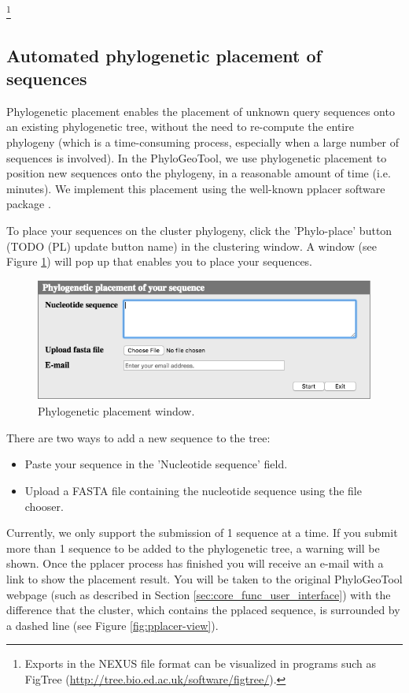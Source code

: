 \documentclass[a4paper, 11pt]{article} %
\begin{document}
\footnote{Exports in the NEXUS file format can be visualized in programs such as FigTree (\url{http://tree.bio.ed.ac.uk/software/figtree/}).}  

\subsection{Automated phylogenetic placement of sequences}
Phylogenetic placement enables the placement of unknown query sequences onto an existing phylogenetic tree, without the need to re-compute the entire phylogeny (which is a time-consuming process, especially when a large number of sequences is involved). 
In the PhyloGeoTool, we use phylogenetic placement to position new sequences onto the phylogeny, in a reasonable amount of time (i.e. minutes). 
We implement this placement using the well-known pplacer software package \cite{Matsen2010}.

To place your sequences on the cluster phylogeny, click the 'Phylo-place' button (TODO (PL) update button name) in the clustering window. 
A window (see Figure \ref{fig:pplacerwindow}) will pop up that enables you to place your sequences. 

\begin{figure}[H]
\centering
\includegraphics[scale=0.50]{images/pplacerWindow.png}
\vspace{-0.25cm}
\caption{Phylogenetic placement window.}
\label{fig:pplacerwindow}
\end{figure}

\noindent There are two ways to add a new sequence to the tree:
\begin{itemize}
\item Paste your sequence in the 'Nucleotide sequence' field.
\item Upload a FASTA file containing the nucleotide sequence using the file chooser.
\end{itemize}
Currently, we only support the submission of 1 sequence at a time.
If you submit more than 1 sequence to be added to the phylogenetic tree, a warning will be shown.
Once the pplacer process has finished you will receive an e-mail with a link to show the placement result.
You will be taken to the original PhyloGeoTool webpage (such as described in Section \ref{sec:core_func_user_interface}) with the difference that the cluster, which contains the pplaced sequence, is surrounded by a dashed line (see Figure \ref{fig:pplacer-view}). 
\end{document}
